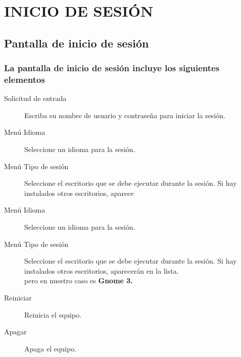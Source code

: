 \documentclass[12pt,letterpaper]{book}
\begin{document}
\part{INICIO DE SESIÓN}
\chapter{Pantalla de inicio de sesión}
\section{La pantalla de inicio de sesión incluye los siguientes elementos}
\begin{description}
\item[Solicitud de entrada] Escriba su nombre de usuario y contraseña para iniciar la sesión.
\item[Menú Idioma] Seleccione un idioma para la sesión.
\item [Menú Tipo de sesión] Seleccione el escritorio que se debe ejecutar durante la sesión. Si hay instalados otros escritorios, aparece
\item[Menú Idioma] Seleccione un idioma para la sesión.
\item [Menú Tipo de sesión] Seleccione el escritorio que se debe ejecutar durante la sesión. Si hay instalados otros escritorios, aparecerán en la lista.\\ pero en nuestro caso es {\bf Gnome 3.}
\item[Reiniciar] Reinicia el equipo.
\item[Apagar] Apaga el equipo.
\end{description}
\end{document}
